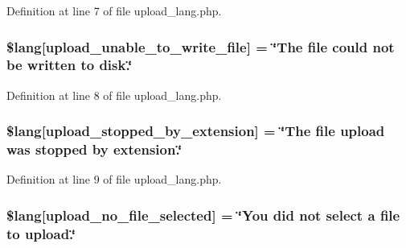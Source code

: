 Definition at line 7 of file upload\+\_\+lang.\+php.

\subsubsection[{\texorpdfstring{\$lang}{$lang}}]{\setlength{\rightskip}{0pt plus 5cm}\$lang\mbox{[}\textquotesingle{}upload\+\_\+unable\+\_\+to\+\_\+write\+\_\+file\textquotesingle{}\mbox{]} = \char`\"{}The file could not be written to disk.\char`\"{}}\hypertarget{system_2language_2english_2upload__lang_8php_a620b622468d4e7781fed6316440c85e7}{}\label{system_2language_2english_2upload__lang_8php_a620b622468d4e7781fed6316440c85e7}


Definition at line 8 of file upload\+\_\+lang.\+php.

\subsubsection[{\texorpdfstring{\$lang}{$lang}}]{\setlength{\rightskip}{0pt plus 5cm}\$lang\mbox{[}\textquotesingle{}upload\+\_\+stopped\+\_\+by\+\_\+extension\textquotesingle{}\mbox{]} = \char`\"{}The file upload was stopped by extension.\char`\"{}}\hypertarget{system_2language_2english_2upload__lang_8php_ae97257deea3dddb33be4bbc6510a464b}{}\label{system_2language_2english_2upload__lang_8php_ae97257deea3dddb33be4bbc6510a464b}


Definition at line 9 of file upload\+\_\+lang.\+php.

\subsubsection[{\texorpdfstring{\$lang}{$lang}}]{\setlength{\rightskip}{0pt plus 5cm}\$lang\mbox{[}\textquotesingle{}upload\+\_\+no\+\_\+file\+\_\+selected\textquotesingle{}\mbox{]} = \char`\"{}You did not select {\bf a} file to upload.\char`\"{}}\hypertarget{system_2language_2english_2upload__lang_8php_a88d8e8f9b879d1c25e6c089f3d3b5a30}{}\label{system_2language_2english_2upload__lang_8php_a88d8e8f9b879d1c25e6c089f3d3b5a30}


